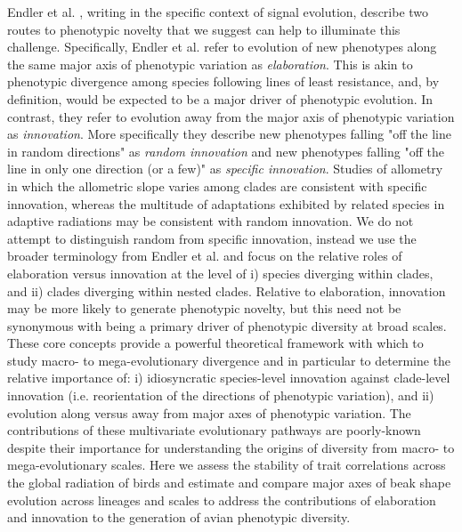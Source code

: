 \documentclass[12pt,letterpaper]{article}
\begin{document}
Endler et al. \cite{endler2005animal}, writing in the specific context of signal evolution, describe two routes to phenotypic novelty that we suggest can help to illuminate this challenge.
Specifically, Endler et al. refer to evolution of new phenotypes along the same major axis of phenotypic variation as \textit{elaboration}.
This is akin to phenotypic divergence among species following lines of least resistance, and, by definition, would be expected to be a major driver of phenotypic evolution.
In contrast, they refer to evolution away from the major axis of phenotypic variation as \textit{innovation}.
More specifically they describe new phenotypes falling "off the line in random directions" as \textit{random innovation} and new phenotypes falling "off the line in only one direction (or a few)" as \textit{specific innovation}.
Studies of allometry in which the allometric slope varies among clades \cite{marroig2005size,Rombaut2022}
are consistent with specific innovation, whereas the multitude of adaptations exhibited by related species in adaptive radiations may be consistent with random innovation.
We do not attempt to distinguish random from specific innovation, instead we use the broader terminology from Endler et al. and focus on the relative roles of elaboration versus innovation at the level of i) species diverging within clades, and ii) clades diverging within nested clades.
Relative to elaboration, innovation may be more likely to generate phenotypic novelty, but this need not be synonymous with being a primary driver of phenotypic diversity at broad scales.
These core concepts provide a powerful theoretical framework with which to study macro- to mega-evolutionary divergence and in particular to determine the relative importance of:
i) idiosyncratic species-level innovation against clade-level innovation (i.e. reorientation of the directions of phenotypic variation),
and ii) evolution along versus away from major axes of phenotypic variation.
The contributions of these multivariate evolutionary pathways are poorly-known despite their importance for understanding the origins of diversity from macro- to mega-evolutionary scales. 
Here we assess the stability of trait correlations across the global radiation of birds and estimate and compare major axes of beak shape evolution across lineages and scales to address the contributions of elaboration and innovation to the generation of avian phenotypic diversity.
 
\end{document}

